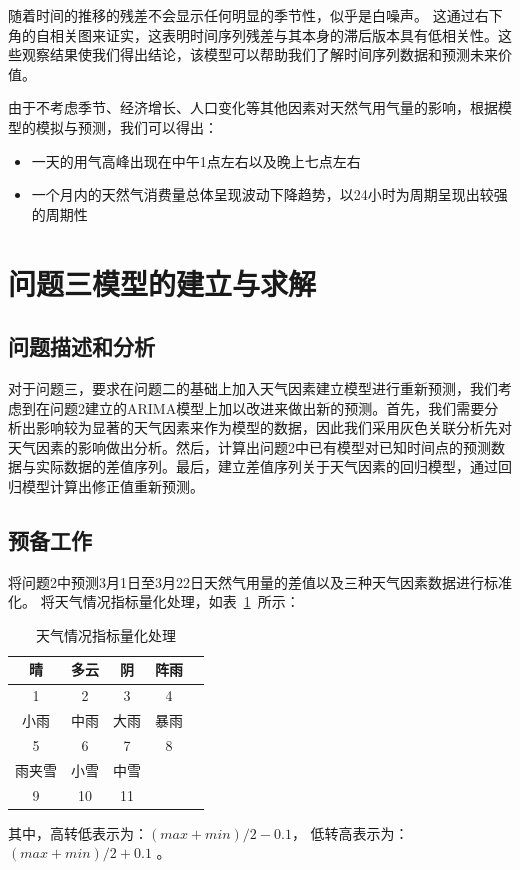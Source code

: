 \documentclass{whutmod}
\begin{document}
	随着时间的推移的残差不会显示任何明显的季节性，似乎是白噪声。 这通过右下角的自相关图来证实，这表明时间序列残差与其本身的滞后版本具有低相关性。这些观察结果使我们得出结论，该模型可以帮助我们了解时间序列数据和预测未来价值。

	由于不考虑季节、经济增长、人口变化等其他因素对天然气用气量的影响，根据模型的模拟与预测，我们可以得出：
	\begin{itemize}
		\item 一天的用气高峰出现在中午1点左右以及晚上七点左右
		\item 一个月内的天然气消费量总体呈现波动下降趋势，以24小时为周期呈现出较强的周期性
	\end{itemize}
	
	
	\section{问题三模型的建立与求解}
	\subsection{问题描述和分析}
对于问题三，要求在问题二的基础上加入天气因素建立模型进行重新预测，我们考虑到在问题2建立的ARIMA模型上加以改进来做出新的预测。首先，我们需要分析出影响较为显著的天气因素来作为模型的数据，因此我们采用灰色关联分析先对天气因素的影响做出分析。然后，计算出问题2中已有模型对已知时间点的预测数据与实际数据的差值序列。最后，建立差值序列关于天气因素的回归模型，通过回归模型计算出修正值重新预测。
	\subsection{预备工作}
	将问题2中预测3月1日至3月22日天然气用量的差值以及三种天气因素数据进行标准化。
	将天气情况指标量化处理，如表~\ref{tabycl}~所示：
	\begin{table}[H]
	\caption{天气情况指标量化处理}\label{tabycl} \centering
	\begin{tabular}{ccccc}
		\toprule[1.5pt]
		晴 & 多云 & 阴 & 阵雨 \\
		\hline
		1&2&3&4\\
		\hline
		小雨 & 中雨 & 大雨&暴雨\\
		\hline
		5&6&7&8\\
		\hline
		雨夹雪 & 小雪 &中雪 \\
		\hline
		9&10&11\\
		\bottomrule[1.5pt]
	\end{tabular}
	\end{table}
	其中，高转低表示为：$(max+min)/2-0.1$，
	低转高表示为：$(max+min)/2+0.1$ 。
\end{document}
